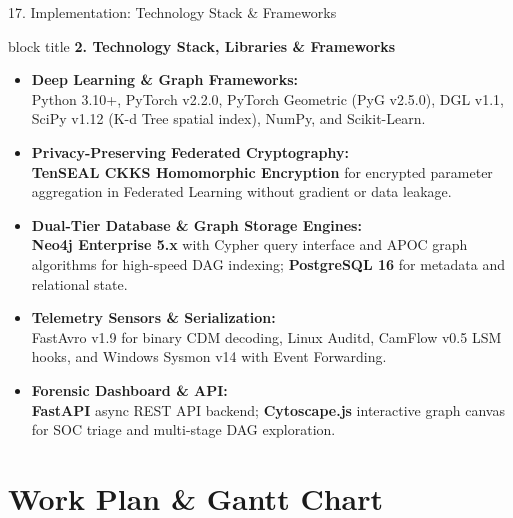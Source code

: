 \documentclass[aspectratio=169,10pt]{beamer}
\begin{document}
\begin{frame}{17. Implementation: Technology Stack \& Frameworks}
\vspace{0.2em}
\begin{beamercolorbox}[rounded=true,shadow=false,sep=0.40em,wd=\textwidth]{block title}
\textbf{\scriptsize 2. Technology Stack, Libraries \& Frameworks}
\end{beamercolorbox}
\vspace{0.2em}
{\fontsize{7.6pt}{11.0pt}\selectfont
\begin{itemize}\itemsep0.32em
  \item \textbf{Deep Learning \& Graph Frameworks:}\\
  Python 3.10+, PyTorch v2.2.0, PyTorch Geometric (PyG v2.5.0), DGL v1.1, SciPy v1.12 (K-d Tree spatial index), NumPy, and Scikit-Learn.
  \item \textbf{Privacy-Preserving Federated Cryptography:}\\
  \textbf{TenSEAL CKKS Homomorphic Encryption} for encrypted parameter aggregation in Federated Learning without gradient or data leakage.
  \item \textbf{Dual-Tier Database \& Graph Storage Engines:}\\
  \textbf{Neo4j Enterprise 5.x} with Cypher query interface and APOC graph algorithms for high-speed DAG indexing; \textbf{PostgreSQL 16} for metadata and relational state.
  \item \textbf{Telemetry Sensors \& Serialization:}\\
  FastAvro v1.9 for binary CDM decoding, Linux Auditd, CamFlow v0.5 LSM hooks, and Windows Sysmon v14 with Event Forwarding.
  \item \textbf{Forensic Dashboard \& API:}\\
  \textbf{FastAPI} async REST API backend; \textbf{Cytoscape.js} interactive graph canvas for SOC triage and multi-stage DAG exploration.
\end{itemize}
}
\end{frame}

\section{Work Plan \& Gantt Chart}
\end{document}
